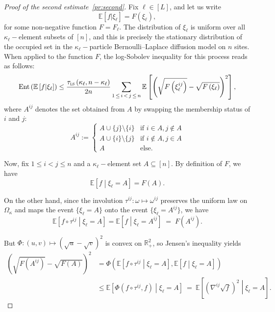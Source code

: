 \documentclass[AHL,Unicode,longabstracts,published]{cedram}
\newcommand{\R}{\mathbb{R}}
\newcommand{\EE}{\mathbb{E}}
\newcommand{\tls}{\tau_{\textsc{ls}}}
\DeclareMathOperator{\ent}{Ent}
\begin{document}
\begin{proof}[Proof of the second estimate~\eqref{pr:second}]
Fix $\ell\in[L]$, and let us write
\begin{equation}\label{def:F}
\EE\left[f|\xi_\ell\right] = F\left(\xi_\ell\right),
\end{equation}
for some non-negative function $F=F_\ell$. The distribution of $\xi_\ell$ is uniform over all $\kappa_\ell-$element subsets of $[n]$, and this is precisely the stationary distribution of the occupied set in the $\kappa_\ell-$particle Bernoulli--Laplace diffusion model on $n$ sites. When applied to the function $F$, the log-Sobolev inequality for this process reads as follows:
\begin{equation}\label{induced}
\ent\left(\EE\left[f|\xi_\ell\right]\right) \le \frac {\tls\left(\kappa_\ell,n-\kappa_\ell\right)}{2n}\sum_{1\,\le\,i\,<\,j\,\le\,n}\EE\left[\left(\sqrt{F\left(\xi_\ell^{ij}\right)}-\sqrt{F\left(\xi_\ell\right)}\right)^2\right],
\end{equation}
where $A^{ij}$ denotes the set obtained from $A$ by swapping the membership status of $i$ and $j$:
\[
A^{ij} :=  
\begin{cases}
A\cup\{j\}\setminus\{i\} & \text{if }i\in A,j\notin A\\
A\cup\{i\}\setminus\{j\} & \text{if }i\notin A,j\in A\\
A & \text{else.}
\end{cases}
\]

Now, fix $1\le i<j\le n$ and a $\kappa_\ell-$element set $A\subseteq[n]$. By definition of $F$, we have
\[
\EE\left[f\middle|\xi_\ell=A\right] = F(A).
\]

On the other hand, since the involution $\tau^{ij}\colon\omega\mapsto \omega^{ij}$ preserves the uniform law on $\Omega_\kappa$ and maps the event $\{\xi_\ell=A\}$ onto the event $\{\xi_\ell=A^{ij}\}$, we have
\[
\EE\left[f\circ\tau^{ij}\middle|\xi_\ell=A\right] = \EE\left[f\middle|\xi_\ell=A^{ij}\right] \; = \; F\left(A^{ij}\right).
\]

But $\Phi\colon (u,v)\mapsto (\sqrt{u}-\sqrt{v})^2 $ is convex on $\R_+^2$, so Jensen's inequality yields
\begin{align*}
\left(\sqrt{F\left(A^{ij}\right)}-\sqrt{F(A)}\right)^2 & = \Phi\left(\EE\left[f\circ\tau^{ij}\middle|\xi_\ell=A\right],\EE\left[f\middle|\xi_\ell=A\right]\right)\\
& \le \EE\left[\Phi\left(f\circ\tau^{ij},f\right)\middle|\xi_\ell=A\right] \ = \ \EE\left[\left(\nabla^{ij} \sqrt{f}\right)^2\middle|\xi_\ell=A\right].
\end{align*}


\end{proof}
\end{document}
